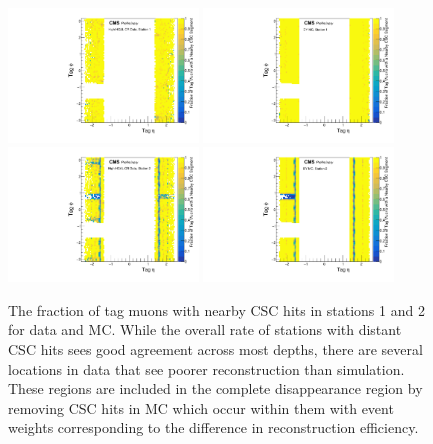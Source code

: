 \begin{figure}[htbp]
    \includegraphics[width=0.45\textwidth]{figures/cscNearbyFracData_station0.pdf}
    \hspace{0.01\textwidth}
    \centering
    \includegraphics[width=0.45\textwidth]{figures/cscNearbyFracMC_station0.pdf}
    \includegraphics[width=0.45\textwidth]{figures/cscNearbyFracData_station1.pdf}
    \hspace{0.01\textwidth}
    \includegraphics[width=0.45\textwidth]{figures/cscNearbyFracMC_station1.pdf}
	\caption[CSC segment efficiencies for stations 1 and 2]{The fraction of tag muons with nearby CSC hits in stations 1 and 2 for data and MC. While the overall rate of stations with distant CSC hits sees good agreement across most depths, there are several locations in data that see poorer reconstruction than simulation. These regions are included in the complete disappearance region by removing CSC hits in MC which occur within them with event weights corresponding to the difference in reconstruction efficiency.}
    \label{fig:CSCeff}

\end{figure}
